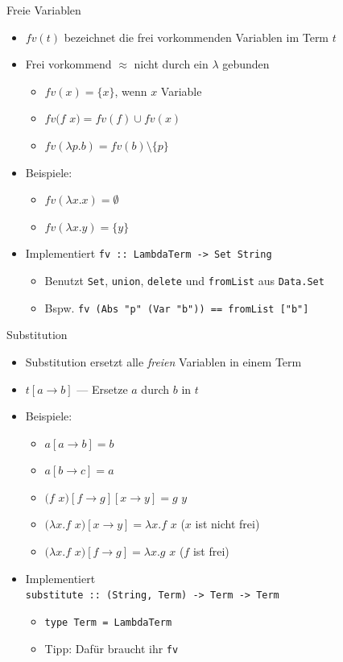 \documentclass{beamer}
\begin{document}
\begin{frame}{Freie Variablen}
	\begin{itemize}
		\item $fv(t)$ bezeichnet die frei vorkommenden Variablen im Term $t$
		\item Frei vorkommend $\approx$ nicht durch ein $\lambda$ gebunden
		\begin{itemize}
			\item $fv(x) = \{x\}$, wenn $x$ Variable
			\item $fv(f$ $x) = fv(f) \cup fv(x)$
			\item $fv(\lambda{}p.b) = fv(b) \setminus \{p\}$
		\end{itemize}
		\item Beispiele:
		\begin{itemize}
			\item $fv(\lambda{}x.x) = \emptyset$
			\item $fv(\lambda{}x.y) = \{y\}$
		\end{itemize}
		\pause
		\item Implementiert \texttt{fv :: LambdaTerm -> Set String}
		\begin{itemize}
			\item Benutzt \texttt{Set}, \texttt{union}, \texttt{delete} und \texttt{fromList} aus \texttt{Data.Set}
            \item Bspw. \texttt{fv (Abs "p" (Var "b")) == fromList ["b"]}
		\end{itemize}
	\end{itemize}
\end{frame}

\begin{frame}{Substitution}
	\begin{itemize}
		\item Substitution ersetzt alle \emph{freien} Variablen in einem Term
		\item $t\left[a \to b\right]$ --- Ersetze $a$ durch $b$ in $t$
		\item Beispiele:
		\begin{itemize}
			\item $a\left[a \to b\right] = b$
			\item $a\left[b \to c\right] = a$
			\item $(f$ $x)\left[f \to g\right]\left[x \to y\right] = g$ $y$
			\pause
			\item $(\lambda{}x.f$ $x)\left[x \to y\right] = \lambda{}x.f$ $x$ ($x$ ist nicht frei)
			\item $(\lambda{}x.f$ $x)\left[f \to g\right] = \lambda{}x.g$ $x$ ($f$ ist frei)
		\end{itemize}
		\pause
		\item Implementiert\\
		      \texttt{substitute :: (String, Term) -> Term -> Term}
		\begin{itemize}
			\item \texttt{type Term = LambdaTerm}
			\item Tipp: Dafür braucht ihr \texttt{fv}
		\end{itemize}
	\end{itemize}
\end{frame}
\end{document}
